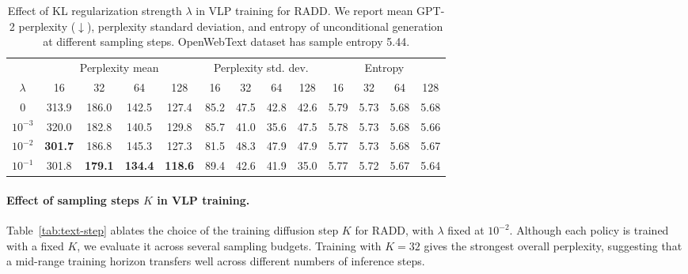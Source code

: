 \begin{table}[h]
\centering
\caption{Effect of KL regularization strength $\lambda$ in VLP training for RADD. We report mean GPT-2 perplexity ($\downarrow$), perplexity standard deviation, and entropy of unconditional generation at different sampling steps. OpenWebText dataset has sample entropy 5.44.}
\setlength{\tabcolsep}{4.0pt}
\begin{tabular}{ccccccccccccc}
\toprule
& \multicolumn{4}{c}{Perplexity mean}
& \multicolumn{4}{c}{Perplexity std. dev.}
& \multicolumn{4}{c}{Entropy} \\
\cmidrule(lr){2-5}\cmidrule(lr){6-9}\cmidrule(lr){10-13}
$\lambda$
& 16 & 32 & 64 & 128
& 16 & 32 & 64 & 128
& 16 & 32 & 64 & 128 \\
\midrule
0
& 313.9 & 186.0 & 142.5 & 127.4
& 85.2 & 47.5 & 42.8 & 42.6
& 5.79 & 5.73 & 5.68 & 5.68 \\
$10^{-3}$
& 320.0 & 182.8 & 140.5 & 129.8
& 85.7 & 41.0 & 35.6 & 47.5
& 5.78 & 5.73 & 5.68 & 5.66 \\
$10^{-2}$
& \textbf{301.7} & 186.8 & 145.3 & 127.3
& 81.5 & 48.3 & 47.9 & 47.9
& 5.77 & 5.73 & 5.68 & 5.67 \\
$10^{-1}$
& 301.8 & \textbf{179.1} & \textbf{134.4} & \textbf{118.6}
& 89.4 & 42.6 & 41.9 & 35.0
& 5.77 & 5.72 & 5.67 & 5.64 \\
\bottomrule
\end{tabular}
\label{tab:text-kl}
\end{table}

\paragraph{Effect of sampling steps $K$ in VLP training.} Table~\ref{tab:text-step} ablates the choice of the training diffusion step $K$ for RADD, with $\lambda$ fixed at $10^{-2}$. Although each policy is trained with a fixed $K$, we evaluate it across several sampling budgets. Training with $K=32$ gives the strongest overall perplexity, suggesting that a mid-range training horizon transfers well across different numbers of inference steps.

